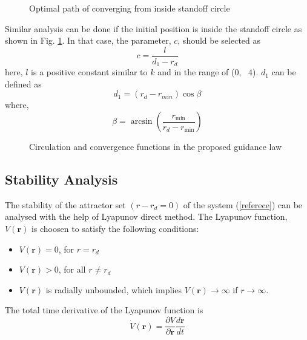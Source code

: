 \documentclass[Afour,sagev,times]{sagej}
\begin{document}
\begin{figure}[t!]
	\centering
	\caption{ Optimal path of converging from inside standoff circle}
	\label{fig:dubii}
\end{figure}

Similar analysis can be done if the initial position is inside the standoff circle as shown in  Fig. \ref{fig:dubii}. In that case, the parameter, $c$, should be selected as
\begin{equation}
c = \frac{l}{d_1- {r_d}}
\end{equation}
here, $l$ is a positive constant similar to $k$ and in the range of ($0$,~ $4$). $d_1$ can be defined as 
\begin{equation}
d_1=({r_d}-r_{min})\cos \beta 
\end{equation} where,
\begin{equation}
\beta  = \arcsin\left( {\frac{{{r_{\min }}}}{{{r_{d }} - {r_{\min }}}}} \right)
\end{equation}


\begin{figure}[t!]
	\centering
	\caption{Circulation and convergence functions in the proposed guidance law}
	\label{fig:hyperbolic }
\end{figure}



\subsection{Stability Analysis}

The stability of the attractor set $(r-r_{d}=0)$ of the system (\ref{referece}) can be  analysed with the help of Lyapunov direct method. The Lyapunov  function,  $V(\boldsymbol{r})$ is choosen to satisfy the following conditions:

\begin{itemize}
	\item $V(\boldsymbol{r})=0$, for $r=r_{d}$
	\item $V(\boldsymbol{r})> 0$, for all $r\neq r_{d}$
	\item $V(\boldsymbol{r})$ is radially unbounded, which implies  $V(\boldsymbol{r})\rightarrow \infty$ if $r\rightarrow \infty$.
\end{itemize}	
		
The total time derivative of the Lyapunov function is
\begin{equation}
\dot{V}(\boldsymbol{r})=\frac{\partial V}{\partial \boldsymbol{r}}\frac{d\boldsymbol{r}}{dt}
\end{equation}
\end{document}

